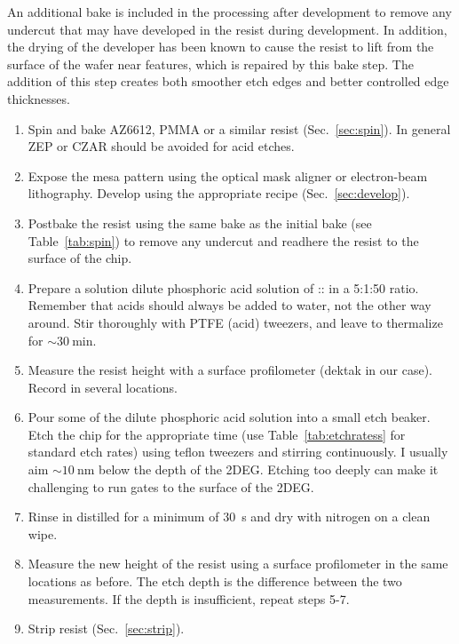 An additional bake is included in the processing after development to remove any undercut that may have developed in the resist during development.
In addition, the drying of the developer has been known to cause the resist to lift from the surface of the wafer near features, which is repaired
by this bake step. The addition of this step creates both smoother etch edges and better controlled edge thicknesses.

\begin{enumerate}
    \item Spin and bake AZ6612, PMMA or a similar resist (Sec.~\ref{sec:spin}). In general ZEP or CZAR should be avoided for acid etches.
    \item Expose the mesa pattern using the optical mask aligner or electron-beam lithography. Develop using the appropriate recipe (Sec.~\ref{sec:develop}).
    \item Postbake the resist using the same bake as the initial bake (see Table~\ref{tab:spin}) to remove any undercut and readhere the resist to the surface of the chip.
    \item Prepare a solution dilute phosphoric acid solution of :: in a 5:1:50 ratio. Remember that acids should always be added to water, not the other way around. Stir thoroughly with PTFE (acid) tweezers, and leave to thermalize for $\sim \SI{30}{\minute}$.
    \item Measure the resist height with a surface profilometer (dektak in our case). Record in several locations.
    \item Pour some of the dilute phosphoric acid solution into a small etch beaker. Etch the chip for the appropriate time (use Table~\ref{tab:etchratess} for standard etch rates) using teflon tweezers and stirring continuously. I usually aim $\sim \SI{10}{\nano\meter}$ below the depth of the 2DEG. Etching too deeply can make it challenging to run gates to the surface of the 2DEG.
    \item Rinse in distilled  for a minimum of \SI{30}{\second} and dry with nitrogen on a clean wipe.
    \item Measure the new height of the resist using a surface profilometer in the same locations as before. The etch depth is the difference between the two measurements. If the depth is insufficient, repeat steps 5-7.
    \item Strip resist (Sec.~\ref{sec:strip}).
\end{enumerate}

